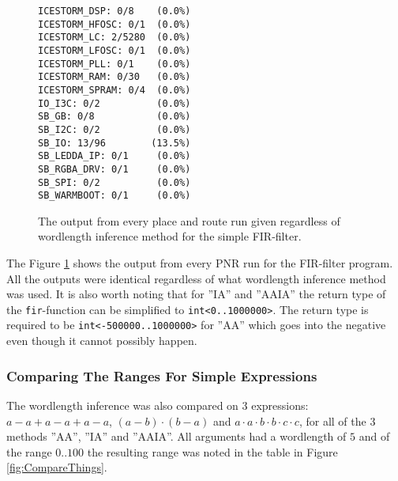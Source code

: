 \begin{figure}
\begin{center}
\begin{verbatim}
ICESTORM_DSP: 0/8    (0.0%)
ICESTORM_HFOSC: 0/1  (0.0%)
ICESTORM_LC: 2/5280  (0.0%)
ICESTORM_LFOSC: 0/1  (0.0%)
ICESTORM_PLL: 0/1    (0.0%)
ICESTORM_RAM: 0/30   (0.0%)
ICESTORM_SPRAM: 0/4  (0.0%)
IO_I3C: 0/2          (0.0%)
SB_GB: 0/8           (0.0%)
SB_I2C: 0/2          (0.0%)
SB_IO: 13/96        (13.5%)
SB_LEDDA_IP: 0/1     (0.0%)
SB_RGBA_DRV: 0/1     (0.0%)
SB_SPI: 0/2          (0.0%)
SB_WARMBOOT: 0/1     (0.0%)
\end{verbatim}
\end{center}

  \caption{The output from every place and route run given regardless of wordlength inference method for the simple FIR-filter.}
  \label{fig:FIRoutput}
\end{figure}

The Figure \ref{fig:FIRoutput} shows the output from every PNR run for the FIR-filter program. All the outputs were identical regardless of what wordlength inference method was used. It is also worth noting that for ''IA'' and ''AAIA'' the return type of the \verb+fir+-function can be simplified to \verb+int<0..1000000>+. The return type is required to be \verb+int<-500000..1000000>+ for ''AA'' which goes into the negative even though it cannot possibly happen.

\subsubsection{Comparing The Ranges For Simple Expressions}
The wordlength inference was also compared on 3 expressions: $a - a + a - a + a - a$, $(a - b) \cdot (b - a)$ and $a \cdot a \cdot b \cdot b \cdot c \cdot c$, for all of the 3 methods ''AA'', ''IA'' and ''AAIA''. All arguments had a wordlength of $5$ and of the range $0..100$ the resulting range was noted in the table in Figure \ref{fig:CompareThings}.

